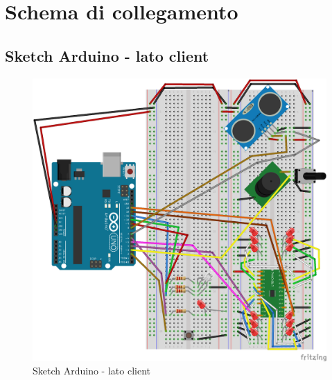 \chapter{Schema di collegamento}
\section{Sketch Arduino - lato client}
\begin{figure}[!ht]
	\centering
	\includegraphics[scale=.60]{img/SketchClient_img.png}
	\caption{Sketch Arduino - lato client}
\end{figure}

